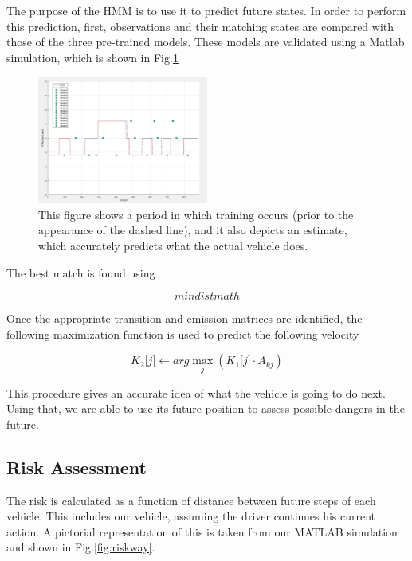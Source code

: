 \documentclass[conference]{IEEEtran}
\begin{document}
The purpose of the HMM is to use it to predict future states. In order to perform this prediction, first, observations and their matching states are compared with those of the three pre-trained models. These models are validated using a Matlab simulation, which is shown in Fig.\ref{fig:trainset}

\begin{figure}[ht]
    \includegraphics[width=0.5\textwidth]{trainset.JPG}
    \caption{This figure shows a period in which training occurs (prior to the appearance of the dashed line), and it also depicts an estimate, which accurately predicts what the actual vehicle does.}
    \label{fig:trainset}
\end{figure}


The best match is found using

\begin{equation}
    min dist math
\end{equation}

Once the appropriate transition and emission matrices are identified, the following maximization function is used to predict the following velocity

\begin{equation}
     K_{2}\lbrack j \rbrack \gets arg \max\limits_{j}(K_{1} \lbrack j \rbrack \cdot A_{kj})
\end{equation}

This procedure gives an accurate idea of what the vehicle is going to do next. Using that, we are able to use its future position to assess possible dangers in the future.

\subsection{Risk Assessment}

The risk is calculated as a function of distance between future steps of each vehicle. This includes our vehicle, assuming the driver continues his current action. A pictorial representation of this is taken from our MATLAB simulation and shown in Fig.\ref{fig:riskway}.
\end{document}
